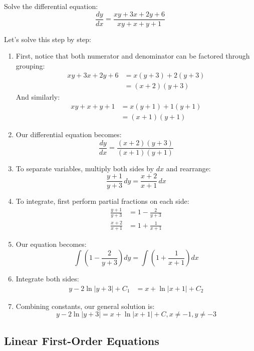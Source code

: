 \exampleline
\begin{example}
Solve the differential equation:
\[
\frac{dy}{dx} = \frac{xy+3x+2y+6}{xy+x+y+1}
\]

\begin{solution}
Let's solve this step by step:
\begin{enumerate}
\item First, notice that both numerator and denominator can be factored through grouping:
   \begin{align*}
   xy+3x+2y+6 &= x(y+3)+2(y+3) \\
   &= (x+2)(y+3)
   \end{align*}
   And similarly:
   \begin{align*}
   xy+x+y+1 &= x(y+1)+1(y+1) \\
   &= (x+1)(y+1)
   \end{align*}

\item Our differential equation becomes:
   \[
   \frac{dy}{dx} = \frac{(x+2)(y+3)}{(x+1)(y+1)}
   \]

\item To separate variables, multiply both sides by $dx$ and rearrange:
   \[
   \frac{y+1}{y+3}\,dy = \frac{x+2}{x+1}\,dx
   \]

\item To integrate, first perform partial fractions on each side:
   \begin{align*}
   \frac{y+1}{y+3} &= 1 - \frac{2}{y+3} \\
   \frac{x+2}{x+1} &= 1 + \frac{1}{x+1}
   \end{align*}

\item Our equation becomes:
   \[
   \int \left(1 - \frac{2}{y+3}\right)dy = \int \left(1 + \frac{1}{x+1}\right)dx
   \]

\item Integrate both sides:
   \begin{align*}
   y - 2\ln|y+3| + C_1 &= x + \ln|x+1| + C_2
   \end{align*}

\item Combining constants, our general solution is:
   \[
   y - 2\ln|y+3| = x + \ln|x+1| + C, x \neq -1, y \neq -3
   \]
\end{enumerate}
\end{solution}
\end{example}
\exampleline


\subsection*{Linear First-Order Equations} 

